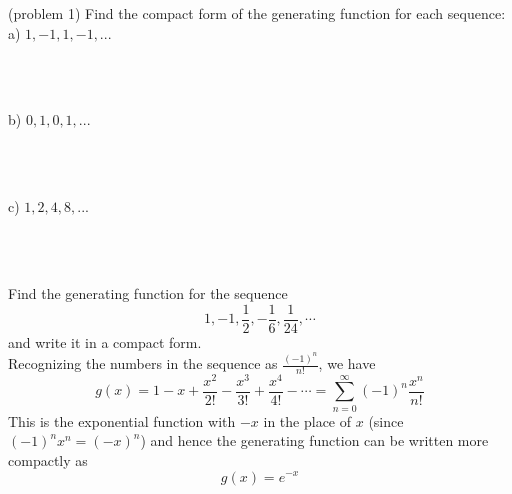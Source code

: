 \documentclass[handout]{ximera}
\begin{document}
\begin{problem}(problem 1)
Find the compact form of the generating function for each sequence:\\
a) $1, -1, 1, -1, ...$
\begin{multipleChoice}
\\
\\
\end{multipleChoice}
b) $0, 1, 0, 1, ...$
\begin{multipleChoice}
\\
\\
\end{multipleChoice}
c) $1, 2, 4, 8, ...$
\begin{multipleChoice}
\\
\\
\end{multipleChoice}

\end{problem}


\begin{example}[example 2]
Find the generating function for the sequence 
\[
1, -1, \frac12, -\frac16, \frac{1}{24}, \cdots
\]
and write it in a compact form.\\
Recognizing the numbers in the sequence as $\frac{(-1)^n}{n!}$, we have 
\[
g(x) = 1 - x + \frac{x^2}{2!} - \frac{x^3}{3!} + \frac{x^4}{4!} - \cdots = \sum_{n=0}^\infty (-1)^n\frac{x^n}{n!}
\]
This is the exponential function with $-x$ in the place of $x$ (since $(-1)^n x^n = (-x)^n$) and 
hence the generating function can be written more compactly as
\[
g(x) = e^{-x}
\]
\end{example}
\end{document}
